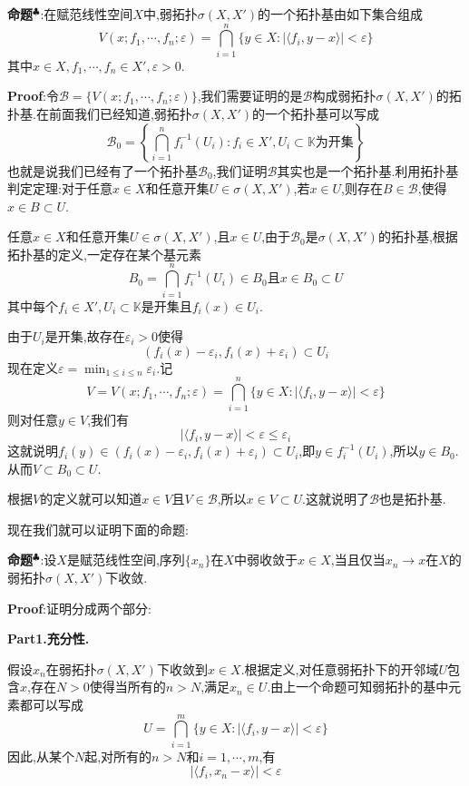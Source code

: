 \textbf{命题}$^\clubsuit $:在赋范线性空间$X$中,弱拓扑$\sigma (X,X')$的一个拓扑基由如下集合组成
$$
V(x;f_1,\cdots,f_n;\varepsilon)=\bigcap_{i=1}^n\{y\in X:|\langle f_i,y-x\rangle|<\varepsilon\}
$$
其中$x\in X,f_1,\cdots,f_n\in X',\varepsilon>0$.\par
\textbf{Proof}:令$\mathcal{B}=\{V(x;f_1,\cdots,f_n;\varepsilon)\}$,我们需要证明的是$\mathcal{B}$构成弱拓扑$\sigma (X,X')$的拓扑基.在前面我们已经知道,弱拓扑$\sigma (X,X')$的一个拓扑基可以写成
$$
\mathcal{B}_0=\left\{\bigcap_{i=1}^{n}f^{-1}_i(U_i):f_i\in X',U_i\subset \mathbb{K}\text{为开集}\right\}
$$
也就是说我们已经有了一个拓扑基$\mathcal{B}_0$,我们证明$\mathcal{B}$其实也是一个拓扑基.利用拓扑基判定定理:对于任意$x\in X$和任意开集$U\in \sigma (X,X')$,若$x\in U$,则存在$B\in\mathcal{B}$,使得$x\in B\subset U$.\par
任意$x\in X$和任意开集$U\in \sigma (X,X')$,且$x\in U$,由于$\mathcal{B}_0$是$\sigma (X,X')$的拓扑基,根据拓扑基的定义,一定存在某个基元素
$$
B_0=\bigcap_{i=1}^{n}f^{-1}_i(U_i)\in B_0\text{且}x\in B_0\subset U
$$
其中每个$f_i\in X',U_i\subset \mathbb{K}$是开集且$f_i(x)\in U_i$.\par
由于$U_i$是开集,故存在$\varepsilon _i>0$使得
$$
(f_i(x)-\varepsilon_i,f_i(x)+\varepsilon_i)\subset U_i
$$
现在定义$\varepsilon=\min_{1\leqslant i\leqslant n}\varepsilon _i$.记
$$
V=V(x;f_1,\cdots,f_n;\varepsilon)=\bigcap_{i=1}^n\{y\in X:|\langle f_i,y-x\rangle|<\varepsilon\}
$$
则对任意$y\in V$,我们有
$$
|\langle f_i,y-x\rangle|<\varepsilon\leqslant\varepsilon_i
$$
这就说明$f_i(y)\in (f_i(x)-\varepsilon_i,f_i(x)+\varepsilon_i)\subset U_i$,即$y\in f^{-1}_{i}(U_i)$,所以$y\in B_0$.从而$V\subset B_0\subset U$.\par
根据$V$的定义就可以知道$x\in V$且$V\in \mathcal{B}$,所以$x\in V\subset U$.这就说明了$\mathcal{B}$也是拓扑基.\par
现在我们就可以证明下面的命题:\par
\textbf{命题}$^\clubsuit $:设$X$是赋范线性空间,序列$\{x_n\}$在$X$中弱收敛于$x\in X$,当且仅当$x_n\to x$在$X$的弱拓扑$\sigma (X,X')$下收敛.\par
\textbf{Proof}:证明分成两个部分:\par
\textbf{Part1.充分性.}\par
假设$x_n$在弱拓扑$\sigma (X,X')$下收敛到$x\in X$.根据定义,对任意弱拓扑下的开邻域$U$包含$x$,存在$N>0$使得当所有的$n>N$,满足$x_n\in U$.由上一个命题可知弱拓扑的基中元素都可以写成
$$
U=\bigcap_{i=1}^m\{y\in X:|\langle f_i,y-x\rangle|<\varepsilon\}
$$
因此,从某个$N$起,对所有的$n>N$和$i=1,\cdots,m$,有
$$
|\langle f_i,x_n-x\rangle|<\varepsilon
$$
